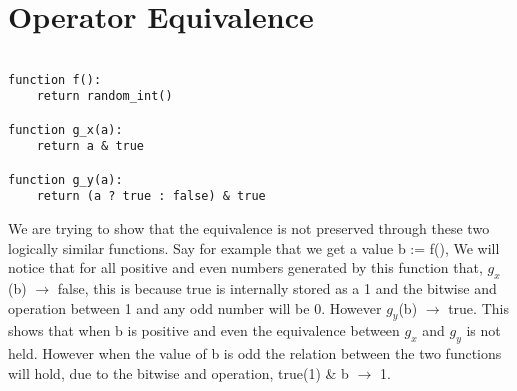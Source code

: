 \documentclass[11pt]{amsart}
\begin{document}
\section{Operator Equivalence}

\begin{verbatim}

function f():
    return random_int()
 
function g_x(a):
    return a & true

function g_y(a):
    return (a ? true : false) & true

\end{verbatim}

We are trying to show that the equivalence is not preserved through these two logically similar functions.  Say for example that we get a value b := f(), We will notice that for all positive and even numbers generated by this function that, $g_x$(b) $\rightarrow$ false, this is because true is internally stored as a 1 and the bitwise and operation between 1 and any odd number will be 0.  However $g_y$(b) $\rightarrow$ true.  This shows that when b is positive and even the equivalence between $g_x$ and $g_y$ is not held.  However when the value of b is odd the relation between the two functions will hold, due to the bitwise and operation, true(1) \& b $\rightarrow$ 1.
\end{document}
